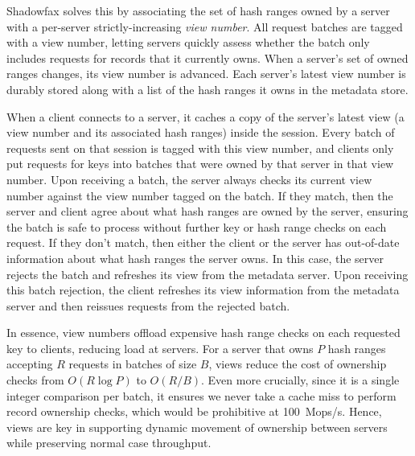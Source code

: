 Shadowfax solves this by associating the set of hash ranges owned by a server
with a per-server strictly-increasing \emph{view number}.
%
All request batches are tagged with a view number, letting servers quickly
assess whether the batch only includes requests for records that it currently owns.
%
When a server's set of owned ranges changes, its view number
is advanced.
%
Each server's latest view number is durably stored along with a list of the
hash ranges it owns in the metadata store.

When a client connects to a server, it caches a copy of the server's
latest view (a view number and its associated hash ranges) inside the session.
%
Every batch of requests sent on that session is tagged with this view number,
and clients only put requests for keys into batches that were owned by that
server in that view number.
%
%
Upon receiving a batch, the server always checks its current view number
against the view number tagged on the batch.
%
If they match, then the server and client agree about what hash ranges are
owned by the server, ensuring the batch is safe to process without further key
or hash range checks on each request.
%
If they don't match, then either the client or the server has out-of-date
information about what hash ranges the server owns.
%
In this case, the server rejects the batch and refreshes its view from the
metadata server.
%
Upon receiving this batch rejection, the client refreshes its view information
from the metadata server and then reissues requests from the rejected batch.

In essence, view numbers offload expensive hash range checks on each requested
key to clients, reducing load at servers.
%
For a server that owns $P$ hash ranges accepting $R$ requests in batches of
size $B$, views reduce the cost of ownership checks from $O(R\log{P})$
to $O(R/B)$.
%
Even more crucially, since it is a single integer comparison per batch, it
ensures we never take a cache miss to perform record ownership checks, which would be prohibitive at 100~Mops/s.
%
Hence, views are key in supporting dynamic movement of ownership between
servers while preserving normal case throughput.
%
%

%

